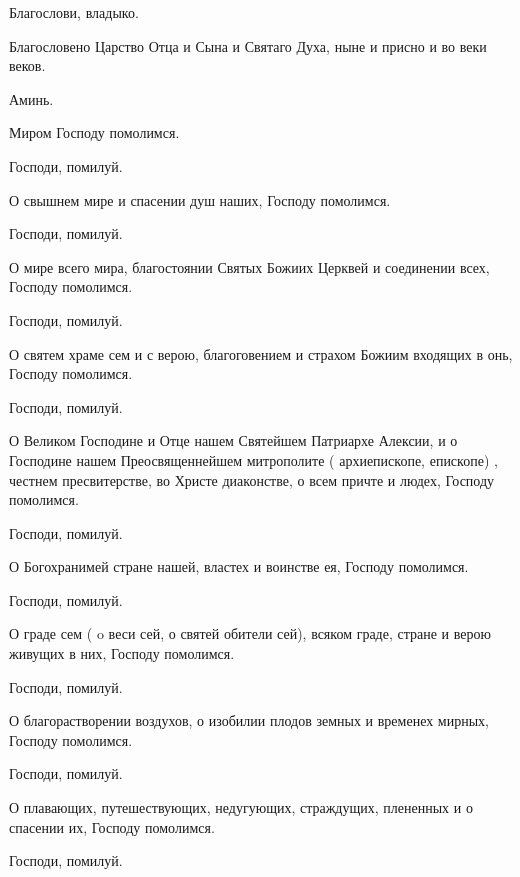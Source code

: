 \begin{mymulticols}

 Благослови, владыко.

 Благословено Царство Отца и Сына и Святаго Духа, ныне и присно и во веки веков. 

 Аминь.


 Миром Господу помолимся. 

 Господи, помилуй.

 О свышнем мире и спасении душ наших, Господу помолимся. 

 Господи, помилуй.

 О мире всего мира, благостоянии Святых Божиих Церквей и соединении всех, Господу помолимся.

 Господи, помилуй.

 О святем храме сем и с верою, благоговением и страхом Божиим входящих в онь, Господу помолимся. 

 Господи, помилуй.

 О Великом Господине и Отце нашем Святейшем Патриархе Алексии, и о Господине нашем Преосвященнейшем митрополите ( архиепископе,  епископе) , честнем пресвитерстве, во Христе диаконстве, о всем причте и людех, Господу помолимся. 

 Господи, помилуй.

 О Богохранимей стране нашей, властех и воинстве ея, Господу помолимся.

 Господи, помилуй.

 О граде сем ( o веси сей,  о святей обители сей), всяком граде, стране и верою живущих в них, Господу помолимся. 

 Господи, помилуй.

 О благорастворении воздухов, о изобилии плодов земных и временех мирных, Господу помолимся.

 Господи, помилуй.

 О плавающих, путешествующих, недугующих, страждущих, плененных и о спасении их, Господу помолимся. 

 Господи, помилуй.


\end{mymulticols}
